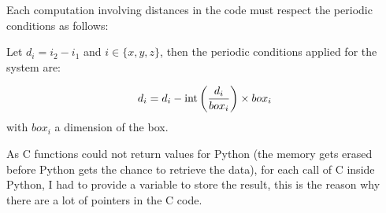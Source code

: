 Each computation involving distances in the code must respect the periodic conditions as follows:

Let $d_i = i_2 - i_1$ and $i \in \{x, y, z\}$, then the periodic conditions applied for the system are:

\[
    d_i = d_i - \text{int}\left(\dfrac{d_i}{box_i}\right) \times box_i\\
\]
with $box_i$ a dimension of the box.

As C functions could not return values for Python (the memory gets erased before Python gets the chance to retrieve the data), for each call of C inside Python, I had to provide a variable to store the result, this is the reason why there are a lot of pointers in the C code.
